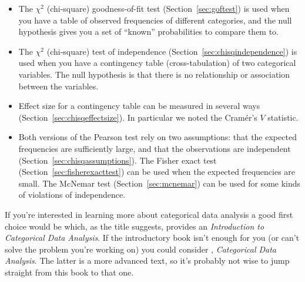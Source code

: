 \begin{itemize}
\item The $\chi^2$ (chi-square) goodness-of-fit test (Section~\ref{sec:goftest}) is used when you have a table of observed frequencies of different categories, and the null hypothesis gives you a set of ``known'' probabilities to compare them to. 
\item The $\chi^2$ (chi-square) test of independence (Section~\ref{sec:chisqindependence}) is used when you have a contingency table (cross-tabulation) of two categorical variables. The null hypothesis is that there is no relationship or association between the variables. 
\item Effect size for a contingency table can be measured in several ways (Section~\ref{sec:chisqeffectsize}). In particular we noted the Cram\'er's $V$ statistic.
\item Both versions of the Pearson test rely on two assumptions: that the expected frequencies are sufficiently large, and that the observations are independent (Section~\ref{sec:chisqassumptions}). The Fisher exact test (Section~\ref{sec:fisherexacttest}) can be used when the expected frequencies are small. The McNemar test (Section~\ref{sec:mcnemar}) can be used for some kinds of violations of independence. 
\end{itemize}

\noindent
If you're interested in learning more about categorical data analysis a good first choice would be \textcite{Agresti1996} which, as the title suggests, provides an {\it Introduction to Categorical Data Analysis}. If the introductory book isn't enough for you (or can't solve the problem you're working on) you could consider \textcite{Agresti2002}, {\it Categorical Data Analysis}. The latter is a more advanced text, so it's probably not wise to jump straight from this book to that one. 


